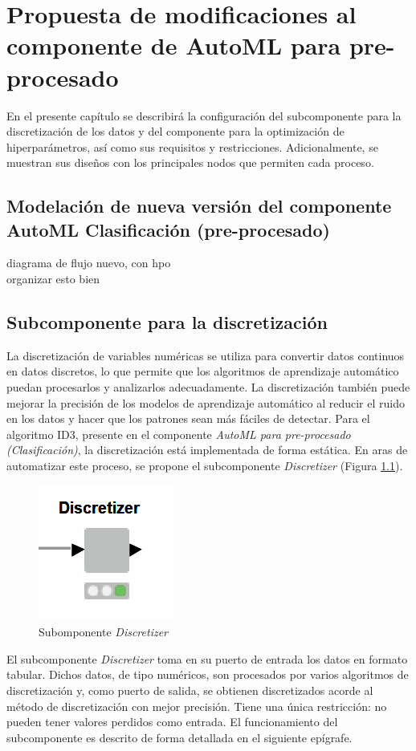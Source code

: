 \chapter{Propuesta de modificaciones al componente de AutoML para pre-procesado}\label{chap:2}
En el presente capítulo se describirá la configuración del subcomponente para la discretización de los datos y del componente para la optimización de hiperparámetros, así como sus requisitos y restricciones. Adicionalmente, se muestran sus diseños con los principales nodos que permiten cada proceso.

\section{Modelación de nueva versión del componente AutoML Clasificación (pre-procesado)}
diagrama de flujo nuevo, con hpo\\


organizar esto bien

\section{Subcomponente para la discretización}
La discretización de variables numéricas se utiliza para convertir datos continuos en datos discretos, lo que permite que los algoritmos de aprendizaje automático puedan procesarlos y analizarlos adecuadamente. La discretización también puede mejorar la precisión de los modelos de aprendizaje automático al reducir el ruido en los datos y hacer que los patrones sean más fáciles de detectar. Para el algoritmo ID3, presente en el componente \textit{AutoML para pre-procesado (Clasificación)}, la discretización está implementada de forma estática. En aras de automatizar este proceso, se propone el subcomponente \textit{Discretizer} (Figura \ref{fig:subcomp-disc}).

\begin{figure}[H]
	\centering
	\includegraphics[width=0.15\linewidth]{"figuras/capi 2/subcomp-disc"}
	\caption[Subcomponente Discretizer]{Subomponente \textit{Discretizer}}
	\label{fig:subcomp-disc}
\end{figure}

El subcomponente \textit{Discretizer} toma en su puerto de entrada los datos en formato tabular. Dichos datos, de tipo numéricos, son procesados por varios algoritmos de discretización y, como puerto de salida, se obtienen discretizados acorde al método de discretización con mejor precisión. Tiene una única restricción: no pueden tener valores perdidos como entrada. El funcionamiento del subcomponente es descrito de forma detallada en el siguiente epígrafe. 


